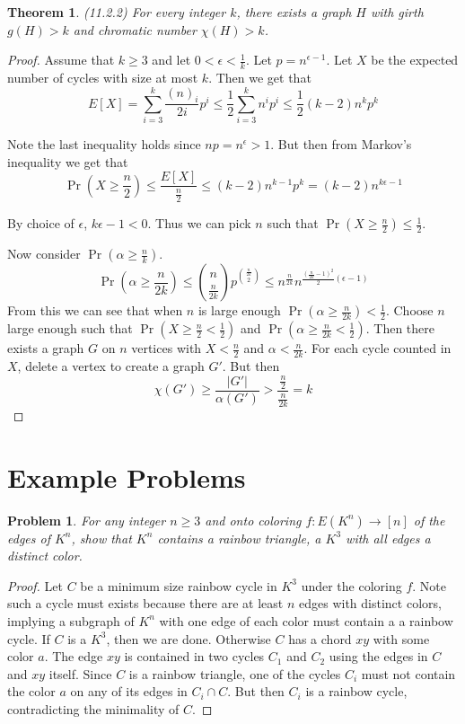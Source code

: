 \documentclass[12pt]{article}
\newtheorem{theorem}{Theorem}
\newtheorem{problem}{Problem}
\begin{document}
\begin{theorem} (11.2.2) For every integer $k$, there exists a graph
  $H$ with girth $g(H) > k$ and chromatic number $\chi(H) > k$.
\end{theorem}
\begin{proof} Assume that $k \geq 3$ and let
  $0 < \epsilon < \frac{1}{k}$. Let $p = n^{\epsilon - 1}$. Let $X$ be
  the expected number of cycles with size at most $k$. Then we get
  that
  \[
    E[X] = \sum_{i = 3}^{k} \dfrac{{(n)}_i}{2i} p^i \leq \dfrac{1}{2}
    \sum_{i = 3}^{k} n^i p^i \leq \dfrac{1}{2} (k - 2) n^k p^k
  \]


  Note the last inequality holds since $np = n^\epsilon > 1$. But then
  from Markov's inequality we get that
  \[
    \Pr(X \geq \frac{n}{2}) \leq \dfrac{E[X]}{\frac{n}{2}} \leq
    (k-2)n^{k - 1} p^k = (k-2) n^{k \epsilon - 1}
  \]


  By choice of $\epsilon$, $k \epsilon - 1 < 0$. Thus we can pick $n$
  such that $\Pr(X \geq \frac{n}{2}) \leq \frac{1}{2}$.

  Now consider $\Pr(\alpha \geq \frac{n}{k})$.
  \[
    \Pr(\alpha \geq \frac{n}{2k}) \leq {n \choose \frac{n}{2k}}
    p^{\frac{n}{2k} \choose 2} \leq n^{\frac{n}{2k}}
    n^{\frac{{(\frac{n}{2k} - 1)}^2}{2}(\epsilon - 1)}
  \]
  From this we can see that when $n$ is large enough
  $\Pr(\alpha \geq \frac{n}{2k}) < \frac{1}{2}$. Choose $n$ large
  enough such that $\Pr(X \geq \frac{n}{2} < \frac{1}{2})$ and
  $\Pr(\alpha \geq \frac{n}{2k} < \frac{1}{2})$. Then there exists a
  graph $G$ on $n$ vertices with $X < \frac{n}{2}$ and
  $\alpha < \frac{n}{2k}$. For each cycle counted in $X$, delete a
  vertex to create a graph $G'$. But then
  \[
    \chi(G') \geq \dfrac{|G'|}{\alpha(G')} >
    \dfrac{\frac{n}{2}}{\frac{n}{2k}} = k
  \]

\end{proof}

\section{Example Problems}
\begin{problem} For any integer $n \geq 3$ and onto coloring
  $f: E(K^n) \to [n]$ of the edges of $K^n$, show that $K^n$ contains
  a rainbow triangle, a $K^3$ with all edges a distinct color.
\end{problem}
\begin{proof} Let $C$ be a minimum size rainbow cycle in $K^3$ under
  the coloring $f$. Note such a cycle must exists because there are at
  least $n$ edges with distinct colors, implying a subgraph of $K^n$
  with one edge of each color must contain a a rainbow cycle. If $C$
  is a $K^3$, then we are done. Otherwise $C$ has a chord $xy$ with
  some color $a$. The edge $xy$ is contained in two cycles $C_1$ and
  $C_2$ using the edges in $C$ and $xy$ itself. Since $C$ is a rainbow
  triangle, one of the cycles $C_i$ must not contain the color $a$ on
  any of its edges in $C_i \cap C$. But then $C_i$ is a rainbow cycle,
  contradicting the minimality of $C$.
\end{proof}
\end{document}
